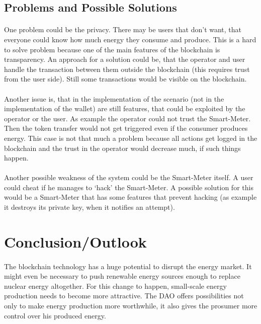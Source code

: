 \documentclass{scrartcl}
\begin{document}
	\subsection{Problems and Possible Solutions}
	
	\paragraph{}
	One problem could be the privacy. There may be users that don’t want, that everyone could know how much energy they consume and produce. This is a hard to solve problem because one of the main features of the blockchain is transparency. An approach for a solution could be, that the operator and user handle the transaction between them outside the blockchain (this requires trust from the user side). Still some transactions would be visible on the blockchain.
	
	\paragraph{}
	Another issue is, that in the implementation of the scenario (not in the implementation of the wallet) are still features, that could be exploited by the operator or the user. As example the operator could not trust the Smart-Meter. Then the token transfer would not get triggered even if the consumer produces energy. This case is not that much a problem because all actions get logged in the blockchain and the trust in the operator would decrease much, if such things happen. 
	
	\paragraph{}
	Another possible weakness of the system could be the Smart-Meter itself. A user could cheat if he manages to ‘hack’ the Smart-Meter. A possible solution for this would be a Smart-Meter that has some features that prevent hacking (as example it destroys its private key, when it notifies an attempt).
	
    \section{Conclusion/Outlook}
    
    \paragraph{}
    The blockchain technology has a huge potential to disrupt the energy market. It might even be necessary to push renewable energy sources enough to replace nuclear energy altogether. For this change to happen, small-scale energy production needs to become more attractive. The DAO offers possibilities not only to make energy production more worthwhile, it also gives the prosumer more control over his produced energy.
    
\end{document}

